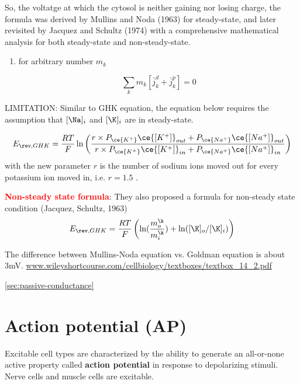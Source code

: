 So, the voltatge at which the cytosol is neither gaining nor losing charge, the
formula was derived by Mullins and Noda (1963) for steady-state, and later
revisited by Jacquez and Schultz (1974) with a comprehensive mathematical
analysis for both steady-state and non-steady-state.
\begin{enumerate}
  
  \item for arbitrary number $m_k$
  
\begin{equation}
\sum\limits_{k} m_k\left[ \bar{j}_k^d + \bar{j}_k^p \right] = 0
\end{equation}
  
\end{enumerate}


LIMITATION: Similar to GHK equation, the equation below requires the assumption
that $[\Na]_i$ and $[\K]_i$ are in steady-state.

\begin{equation}
  E_{\rev,GHK} = %
  \frac{RT}{F}\ln 
  \left( 
    \frac{
      r \times P_{\ce{K^+}}\ce{[K^+]}_{out} +  P_{\ce{Na^+}}\ce{[Na^+]}_{out}  
    }{ r \times P_{\ce{K^+}}\ce{[K^+]}_{in} +  P_{\ce{Na^+}}\ce{[Na^+]}_{in}  
    } 
   \right)
\end{equation}
with the new parameter $r$ is the number of sodium ions moved out for every
potassium ion moved in, i.e. $r=1.5$ \citep{mullins1963}.

\textcolor{red}{\bf Non-steady state formula}: They also proposed a formula for
non-steady state condition (Jacquez, Schultz, 1963)
\begin{equation}
  E_{\rev,GHK} = %
  \frac{RT}{F}\left(\ln (\frac{m_o^\k}{m_i^\k}) 
  + \ln ([\K]_o/[\K]_i)  
   \right)
\end{equation}

The difference between Mullins-Noda equation vs. Goldman equation is about 3mV. 
\url{www.wileyshortcourse.com/cellbiology/textboxes/textbox_14_2.pdf}


\ref{sec:passive-conductance}

\section{Action potential (AP)}
\label{sec:action-potential}

Excitable cell types are characterized by the ability to generate an all-or-none
active property called {\bf action potential}  in response to depolarizing
stimuli. Nerve cells and muscle cells are excitable.

